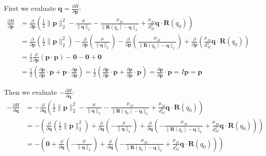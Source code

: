 \documentclass[titlepage]{article}
\begin{document}
First we evaluate $\dot{\boldsymbol{q}}=\frac{\partial H}{\partial\boldsymbol{p}}$:
\begin{equation}
	\begin{split}
		\frac{\partial H}{\partial\boldsymbol{p}}&=\frac{\partial}{\partial\boldsymbol{p}}\left(\frac{1}{2}\|\boldsymbol{p}\|_2^2-\frac{\mu}{\|\boldsymbol{q}\|_2}-\frac{\mu_M}{\|\boldsymbol{R}(q_0)-\boldsymbol{q}\|_2}+\frac{\mu_M}{d_M^3}\boldsymbol{q}\cdot\boldsymbol{R}(q_0)\right) \\
		&=\frac{\partial}{\partial\boldsymbol{p}}\left(\frac{1}{2}\|\boldsymbol{p}\|_2^2\right)-\frac{\partial}{\partial\boldsymbol{p}}\left(\frac{\mu}{\|\boldsymbol{q}\|_2}\right)-\frac{\partial}{\partial\boldsymbol{p}}\left(\frac{\mu_M}{\|\boldsymbol{R}(q_0)-\boldsymbol{q}\|_2}\right)+\frac{\partial}{\partial\boldsymbol{p}}\left(\frac{\mu_M}{d_M^3}\boldsymbol{q}\cdot\boldsymbol{R}(q_0)\right) \\
		&=\frac{1}{2}\frac{\partial}{\partial\boldsymbol{p}}\left(\boldsymbol{p}\cdot\boldsymbol{p}\right)-\boldsymbol{0}-\boldsymbol{0}+\boldsymbol{0} \\
		&=\frac{1}{2}\left(\frac{\partial\boldsymbol{p}}{\partial\boldsymbol{p}}\cdot\boldsymbol{p}+\boldsymbol{p}\cdot\frac{\partial\boldsymbol{p}}{\partial\boldsymbol{p}}\right)=\frac{1}{2}\left(\frac{\partial\boldsymbol{p}}{\partial\boldsymbol{p}}\cdot\boldsymbol{p}+\frac{\partial\boldsymbol{p}}{\partial\boldsymbol{p}}\cdot\boldsymbol{p}\right)=\frac{\partial\boldsymbol{p}}{\partial\boldsymbol{p}}\cdot\boldsymbol{p}=I\boldsymbol{p}=\boldsymbol{p}
	\end{split}
\end{equation}

Then we evaluate $-\frac{\partial H}{\partial\boldsymbol{q}}$:
\begin{equation}
	\begin{split}
		-\frac{\partial H}{\partial\boldsymbol{q}}&=-\frac{\partial}{\partial\boldsymbol{q}}\left(\frac{1}{2}\|\boldsymbol{p}\|_2^2-\frac{\mu}{\|\boldsymbol{q}\|_2}-\frac{\mu_M}{\|\boldsymbol{R}(q_0)-\boldsymbol{q}\|_2}+\frac{\mu_M}{d_M^3}\boldsymbol{q}\cdot\boldsymbol{R}(q_0)\right) \\
		&=-\left(\frac{\partial}{\partial\boldsymbol{q}}\left(\frac{1}{2}\|\boldsymbol{p}\|_2^2\right)+\frac{\partial}{\partial\boldsymbol{q}}\left(-\frac{\mu}{\|\boldsymbol{q}\|_2}\right)+\frac{\partial}{\partial\boldsymbol{q}}\left(-\frac{\mu_M}{\|\boldsymbol{R}(q_0)-\boldsymbol{q}\|_2}+\frac{\mu_M}{d_M^3}\boldsymbol{q}\cdot\boldsymbol{R}(q_0)\right)\right) \\
		&=-\left(\boldsymbol{0}+\frac{\partial}{\partial\boldsymbol{q}}\left(-\frac{\mu}{\|\boldsymbol{q}\|_2}\right)+\frac{\partial}{\partial\boldsymbol{q}}\left(-\frac{\mu_M}{\|\boldsymbol{R}(q_0)-\boldsymbol{q}\|_2}+\frac{\mu_M}{d_M^3}\boldsymbol{q}\cdot\boldsymbol{R}(q_0)\right)\right)
	\end{split}
\end{equation}
\end{document}
